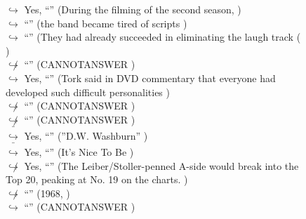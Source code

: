 \documentclass[11pt,a4paper, onecolumn]{article}
\begin{document}
\begin{figure}[t] \small \begin{tcolorbox}[boxsep=0pt,left=5pt,right=0pt,top=2pt,colback = yellow!5] \begin{dialogue}
 \small 
\colorbox{pink!25}{$\hookrightarrow$}
\colorbox{red!25}{Yes,}
{ ``'' (During the filming of the second season, ) }
\\
\colorbox{pink!25}{$\hookrightarrow$}
{ ``'' (the band became tired of scripts ) }
\\
\colorbox{pink!25}{$\hookrightarrow$}
{ ``'' (They had already succeeded in eliminating the laugh track ( ) }
\\
\colorbox{pink!25}{$\not\hookrightarrow$}
{ ``'' (CANNOTANSWER ) }
\\
\colorbox{pink!25}{$\hookrightarrow$}
\colorbox{red!25}{Yes,}
{ ``'' (Tork said in DVD commentary that everyone had developed such difficult personalities ) }
\\
\colorbox{pink!25}{$\not\hookrightarrow$}
{ ``'' (CANNOTANSWER ) }
\\
\colorbox{pink!25}{$\not\hookrightarrow$}
{ ``'' (CANNOTANSWER ) }
\\
\colorbox{pink!25}{ $\bar{\hookrightarrow}$}
\colorbox{red!25}{Yes,}
{ ``'' (''D.W. Washburn'' ) }
\\
\colorbox{pink!25}{ $\bar{\hookrightarrow}$}
\colorbox{red!25}{Yes,}
{ ``'' (It's Nice To Be ) }
\\
\colorbox{pink!25}{$\not\hookrightarrow$}
\colorbox{red!25}{Yes,}
{ ``'' (The Leiber/Stoller-penned A-side would break into the Top 20, peaking at No. 19 on the charts. ) }
\\
\colorbox{pink!25}{$\not\hookrightarrow$}
{ ``'' (1968, ) }
\\
\colorbox{pink!25}{$\hookrightarrow$}
{ ``'' (CANNOTANSWER ) }
\\
 \end{dialogue}\end{tcolorbox}\end{figure}
\end{document}
